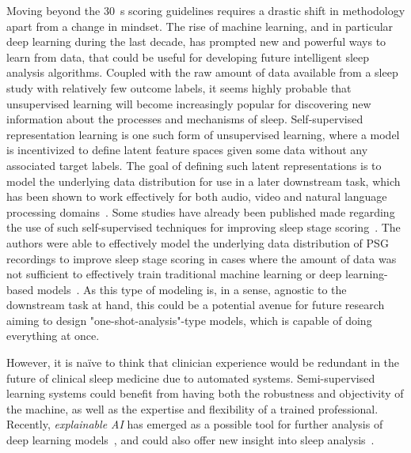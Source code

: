 Moving beyond the \SI{30}{\second} scoring guidelines requires a drastic shift in methodology apart from a change in mindset.
The rise of machine learning, and in particular deep learning during the last decade, has prompted new and powerful ways to learn from data, that could be useful for developing future intelligent sleep analysis algorithms.
Coupled with the raw amount of data available from a sleep study with relatively few outcome labels, it seems highly probable that unsupervised learning will become increasingly popular for discovering new information about the processes and mechanisms of sleep.
Self-supervised representation learning is one such form of unsupervised learning, where a model is incentivized to define latent feature spaces given some data without any associated target labels.
The goal of defining such latent representations is to model the underlying data distribution for use in a later downstream task, which has been shown to work effectively for both audio, video and natural language processing domains~\cite{Oord2018, Henaff2019}.
Some studies have already been published made regarding the use of such self-supervised techniques for improving sleep stage scoring~\cite{Banville2019}.
The authors were able to effectively model the underlying data distribution of \ac{PSG} recordings to improve sleep stage scoring in cases where the amount of data was not sufficient to effectively train traditional machine learning or deep learning-based models~\cite{Banville2019}.
As this type of modeling is, in a sense, agnostic to the downstream task at hand, this could be a potential avenue for future research aiming to design "one-shot-analysis"-type models, which is capable of doing everything at once.

However, it is naïve to think that clinician experience would be redundant in the future of clinical sleep medicine due to automated systems.
Semi-supervised learning systems could benefit from having both the robustness and objectivity of the machine, as well as the expertise and flexibility of a trained professional.
Recently, \textit{explainable \ac{AI}} has emerged as a possible tool for further analysis of deep learning models~\cite{Samek2019}, and could also offer new insight into sleep analysis~\cite{Vilamala2017}.


